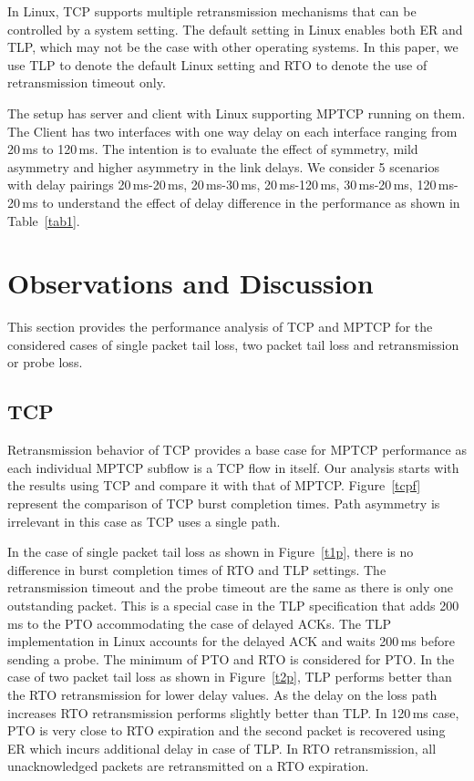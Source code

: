 \documentclass[10pt,conference]{IEEEtran}
\begin{document}
In Linux, TCP supports multiple retransmission mechanisms that can be controlled by a system setting. The default setting in Linux enables both
ER and TLP, which may not be the case with other operating systems. In this paper, we use TLP to denote the default Linux setting and RTO to denote the use of retransmission timeout only.

The setup has server and client with Linux supporting MPTCP running on them. The Client has two interfaces with one way delay on each interface ranging from 20\,ms to 120\,ms. The intention is to evaluate the effect of symmetry, mild asymmetry and higher asymmetry in the link delays. We consider 5 scenarios with delay pairings 20\,ms-20\,ms, 20\,ms-30\,ms, 20\,ms-120\,ms, 30\,ms-20\,ms, 120\,ms-20\,ms to understand the effect of delay difference in the performance as shown in Table~\ref{tab1}.

\section{Observations and Discussion}\label{disc}
This section provides the performance analysis of TCP and MPTCP for the considered cases of single packet tail loss, two packet tail loss and retransmission or probe loss.
\subsection{TCP}
Retransmission behavior of TCP provides a base case for MPTCP performance as each individual MPTCP subflow is a TCP flow in itself. Our analysis
starts with the results using TCP and compare it with that of MPTCP. Figure~\ref{tcpf} represent the comparison of TCP 
burst completion times. Path asymmetry is irrelevant in this case as TCP uses a single path.

In the case of single packet tail loss as shown in Figure~\ref{t1p}, there is no difference in burst completion times of RTO and TLP settings. The retransmission
timeout and the probe timeout are the same as there is only one outstanding packet. This is a special case in the TLP
specification that adds 200\,ms to the PTO accommodating the case of delayed ACKs. The TLP implementation in Linux accounts
for the delayed ACK and waits 200\,ms before sending a probe. The minimum of PTO and RTO is considered for PTO. In the case of two packet tail loss as shown in Figure~\ref{t2p},
TLP performs better than the RTO retransmission for lower delay values. As the delay on the loss path increases RTO retransmission performs slightly better than TLP. In 120\,ms case, PTO is very close to RTO expiration and the second packet is recovered using ER which incurs additional delay in case of TLP. In RTO retransmission, all unacknowledged packets are retransmitted on a RTO expiration. 
\end{document}
